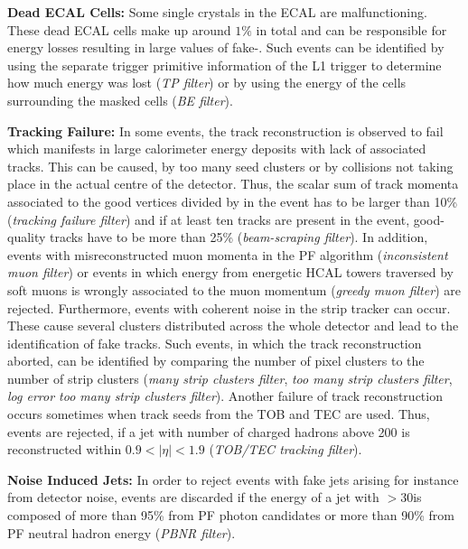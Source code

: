 \begin{description}
 \item{\textbf{Dead ECAL Cells:}} Some single crystals in the ECAL are malfunctioning. These dead ECAL cells make up around $1\%$ in total and can be responsible for energy losses resulting in large values of fake-\MHT. Such events can be identified by using the separate trigger primitive information of the L1 trigger to determine how much energy was lost (\textit{TP filter}) or by using the energy of the cells surrounding the masked cells (\textit{BE filter}).
 \item{\textbf{Tracking Failure:}} In some events, the track reconstruction is observed to fail which manifests in large calorimeter energy deposits with lack of associated tracks. This can be caused, \eg by too many seed clusters or by collisions not taking place in the actual centre of the detector. Thus, the scalar sum of track momenta associated to the good vertices divided by \HT in the event has to be larger than 10\% (\textit{tracking failure filter}) and if at least ten tracks are present in the event, good-quality tracks have to be more than 25\% (\textit{beam-scraping filter}). In addition, events with misreconstructed muon momenta in the PF algorithm (\textit{inconsistent muon filter}) or events in which energy from energetic HCAL towers traversed by soft muons is wrongly associated to the muon momentum (\textit{greedy muon filter}) are rejected. Furthermore, events with coherent noise in the strip tracker can occur. These cause several clusters distributed across the whole detector and lead to the identification of fake tracks. Such events, in which the track reconstruction aborted, can be identified by comparing the number of pixel clusters to the number of strip clusters (\textit{many strip clusters filter}, \textit{too many strip clusters filter}, \textit{log error too many strip clusters filter}). Another failure of track reconstruction occurs sometimes when track seeds from the TOB and TEC are used. Thus, events are rejected, if a jet with number of charged hadrons above 200 is reconstructed within $0.9 < |\eta| < 1.9$ (\textit{TOB/TEC tracking filter}).
 \item{\textbf{Noise Induced Jets:}} In order to reject events with fake jets arising for instance from detector noise, events are discarded if the energy of a jet with \pt$ > 30$\gev is composed of more than 95\% from PF photon candidates or more than 90\% from PF neutral hadron energy (\textit{PBNR filter}).
\end{description}

